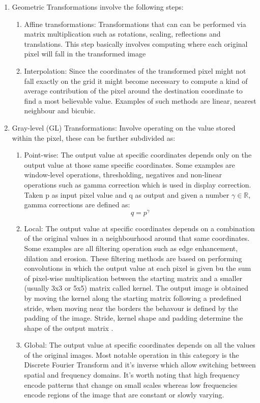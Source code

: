 \begin{enumerate}
\item Geometric Transformations involve the following steps:
		\begin{enumerate}
		\item Affine transformations: Transformations that can can be performed via matrix multiplication such as rotations, scaling, reflections and translations. This step basically involves computing where each original pixel will fall in the transformed image
		\item Interpolation: Since the coordinates of the transformed pixel might not fall exactly on the grid it might become necessary to compute a kind of average contribution of the pixel around the destination coordinate to find a most believable value. Examples of such methods are linear, nearest neighbour and bicubic.
		\end{enumerate}
\item Gray-level (GL) Transformations: Involve operating on the value stored within the pixel, these can be further subdivided as:
		\begin{enumerate}
		\item Point-wise: The output value at specific coordinates depends only on the output value at those same specific coordinates. Some examples are window-level operations, thresholding, negatives and non-linear operations such as gamma correction which is used in display correction. Taken p as input pixel value and q as output and given a number $\gamma \in \mathbb{R}$, gamma corrections are defined as:
		\begin{equation}
		q = p^{\gamma}
		\end{equation}
    \item Local: The output value at specific coordinates depends on a combination of the original values in a neighbourhood around that same coordinates. Some examples are all filtering operation such as edge enhancement, dilation and erosion. These filtering methods are based on performing convolutions in which the output value at each pixel is given bu the sum of pixel-wise multiplication between the starting matrix and a smaller (usually 3x3 or 5x5) matrix called kernel. The output image is obtained by moving the kernel along the starting matrix following a predefined stride, when moving near the borders the behavour is defined by the padding of the image. Stride, kernel shape and padding determine the shape of the output matrix .
		\item Global: The output value at specific coordinates depends on all the values of the original images. Most notable operation in this category is the Discrete Fourier Transform and it's inverse which allow switching between spatial and frequency domains. It's worth noting that high frequency encode patterns that change on small scales whereas low frequencies encode regions of the image that are constant or slowly varying.
		\end{enumerate}
\end{enumerate}

